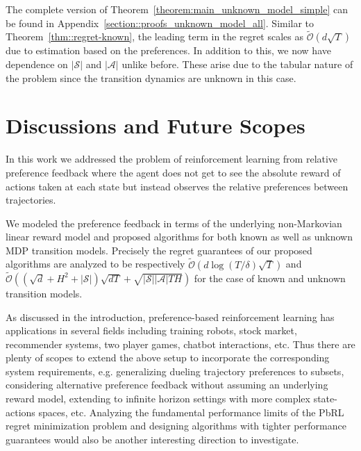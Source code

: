 The complete version of Theorem~\ref{theorem:main_unknown_model_simple} can be found in Appendix~\ref{section::proofs_unknown_model_all}. Similar to Theorem~\ref{thm::regret-known}, the leading term in the regret scales as $\widetilde {\mathcal O}(d\sqrt{T})$ due to estimation based on the preferences. In addition to this, we now have dependence on $|\mathcal S|$ and $|\mathcal A|$ unlike before.  These arise due to the tabular nature of the problem since the transition dynamics are unknown in this case.

\section{Discussions and Future Scopes}
\label{sec:concl}

In this work we addressed the problem of reinforcement learning from relative preference feedback where the agent does not get to see the absolute reward of actions taken at each state but instead observes the relative preferences between trajectories.

We modeled the preference feedback in terms of the underlying non-Markovian linear reward model and proposed  algorithms for both known as well as unknown MDP transition models. Precisely the regret guarantees of our proposed algorithms are analyzed to be respectively 
 $\widetilde{\mathcal O}\left(  d  \log (T / \delta) \sqrt{T}  \right)$ and
$\widetilde{\mathcal O}((\sqrt{d} + H^2 + |\mathcal{S}|)\sqrt{dT} +\sqrt{|\mathcal{S}||\mathcal{A}|TH} )$ for the case of known and unknown transition models.

As discussed in the introduction, preference-based reinforcement learning has applications in several fields including training robots, stock market, recommender systems, two player games, chatbot interactions, etc. Thus there are plenty of scopes to extend the above setup to incorporate the corresponding system requirements, e.g. generalizing dueling trajectory preferences to subsets, considering alternative preference feedback without assuming an underlying reward model, extending to infinite horizon settings with more complex state-actions spaces, etc. Analyzing the fundamental performance limits of the PbRL regret minimization problem and designing algorithms with tighter performance guarantees would also be another interesting direction to investigate.


